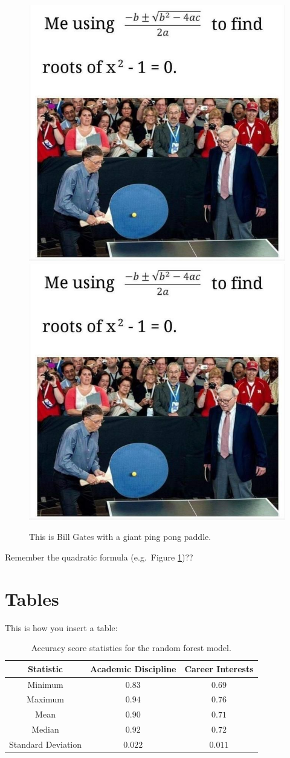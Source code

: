 \documentclass[11pt]{article}
\begin{document}
\begin{figure}[h]
\centering
\includegraphics[width = .45\textwidth]{Figures/Histogram.jpeg}
\includegraphics[width = .45\textwidth]{Figures/Histogram.jpeg}
\caption{This is Bill Gates with a giant ping pong paddle. }
\label{Bill}

\end{figure}

Remember the quadratic formula (e.g.~Figure \ref{Bill})??


\pagebreak


\section{Tables}

This is how you insert a table: 

\begin{table}[h]
\begin{center}
\caption{ Accuracy score statistics for the random forest model.}
    \begin{tabular}[h]{ c|c|c}
    \centering
     \textbf{Statistic}& \textbf{Academic Discipline} & \textbf{Career Interests} \\
     \hline\hline
        Minimum & $0.83$ & $0.69$\\\hline
        Maximum & $0.94$ & $0.76$\\\hline
        Mean & $0.90$  & $0.71$ \\\hline
        Median & $0.92$  & $0.72$\\\hline
        Standard Deviation & $0.022$  & $0.011$\\\hline\hline
    \end{tabular}
    \label{Forest_Statistics}
\end{center}
\end{table}
\end{document}
